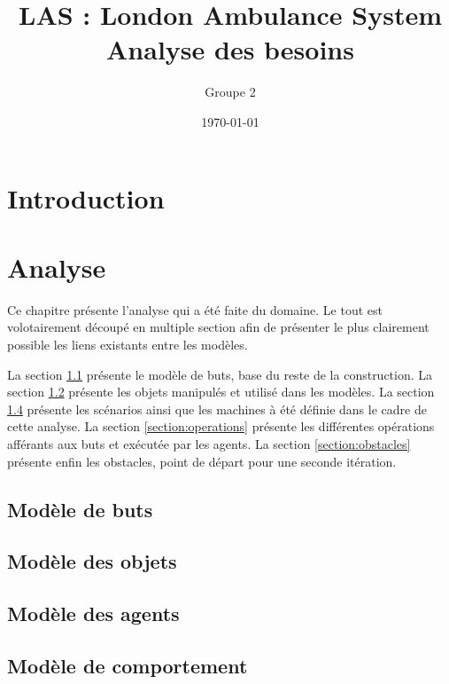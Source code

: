 \documentclass{report}
\title{LAS : London Ambulance System\\ \Large{Analyse des besoins}}
\author{Groupe 2}
\date{\today}
\begin{document}
\setlength{\parskip}{1em}

\maketitle
\tableofcontents

\chapter*{Introduction}
	
	
\chapter{Analyse}
	Ce chapitre présente l'analyse qui a été faite du domaine. Le tout est 
	volotairement découpé en multiple section afin de présenter le plus 
	clairement possible les liens existants entre les modèles. 
	
	La section \ref{section:buts} présente le modèle de buts, base du reste de 
	la construction.
	La section \ref{section:objets} présente les objets manipulés et utilisé 
	dans les modèles. La section \ref{section:comportement} présente
	les scénarios ainsi que les machines à été définie dans le cadre de
	cette analyse. 
	La section \ref{section:operations} présente les différentes opérations 
	afférants aux buts et exécutée par les agents.
	La section \ref{section:obstacles} présente enfin les obstacles, point
	de départ pour une seconde itération.
		
	\section{Modèle de buts}\label{section:buts}
		
		
	\section{Modèle des objets}\label{section:objets}
		

	\section{Modèle des agents}\label{section:agents}
		
		
	\section{Modèle de comportement}\label{section:comportement}
		
\end{document}
